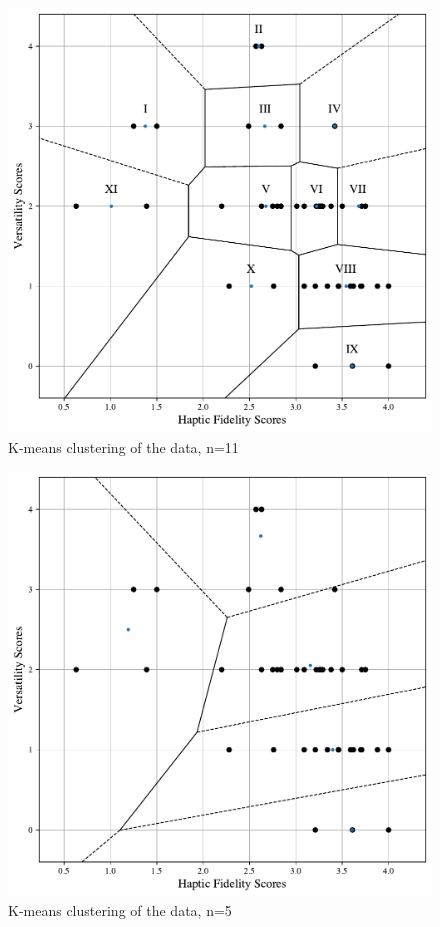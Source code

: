 \begin{figure}[htbp]
    \centering
    \includegraphics[width=\columnwidth]{figures/k_means_11.pdf} 
    \caption{K-means clustering of the data, n=11}
    \label{fig:kmeans}
\end{figure}

\begin{figure}[htbp]
    \centering
    \includegraphics[width=\columnwidth]{figures/k_means_5.pdf} 
    \caption{K-means clustering of the data, n=5}
    \label{fig:kmeans}
\end{figure}



